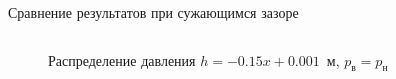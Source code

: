 \documentclass[ignoreonframetext,unicode]{beamer}
\begin{document}
\begin{frame}{Сравнение результатов при сужающимся зазоре}
\begin{columns}
	\begin{figure}[!htbp]
		\caption{Распределение давления $h = -0.15 x + 0.001$~м, $p_{\text{в}} = p_{\text{н}}$}
		\label{zero_neg}
	\end{figure}
	\end{columns}
\end{frame}
\end{document}
